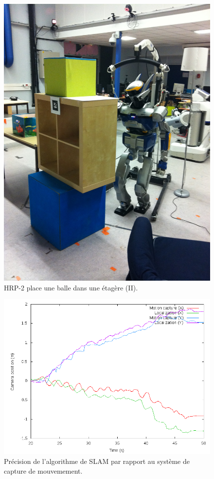 \begin{figure}
  \begin{center}
    \includegraphics[width=.95\linewidth]{src/chap3-primitive-mouvement/demo2.jpg}
  \end{center}
  \caption{HRP-2 place une balle dans une étagère (II).}
\end{figure}


\begin{figure}
  \begin{center}
    \includegraphics[width=.95\linewidth]{src/chap3-primitive-mouvement/mocap.png}
  \end{center}
  \caption{Précision de l'algorithme de SLAM par rapport au système de
    capture de mouvemement. \label{fig:scenario_visu_precision}}
\end{figure}

